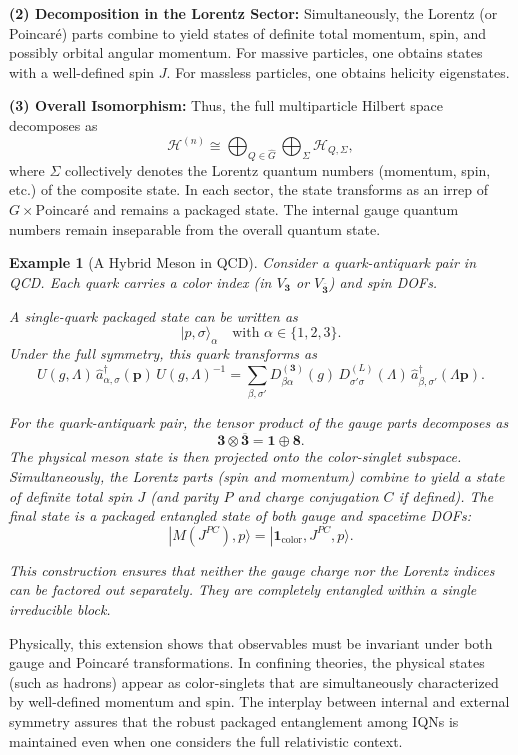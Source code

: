 \documentclass[12pt,a4paper]{article}
\newtheorem{example}{Example}
\begin{document}
\textbf{(2) Decomposition in the Lorentz Sector:}  
Simultaneously, the Lorentz (or Poincaré) parts combine to yield states of definite total momentum, spin, and possibly orbital angular momentum.
For massive particles, one obtains states with a well-defined spin $J$.
For massless particles, one obtains helicity eigenstates.

\textbf{(3) Overall Isomorphism:}  
Thus, the full multiparticle Hilbert space decomposes as
\[
\mathcal{H}^{(n)} \cong \bigoplus_{Q\in\hat{G}} \bigoplus_{\Sigma} \mathcal{H}_{Q,\Sigma},
\]
where $\Sigma$ collectively denotes the Lorentz quantum numbers (momentum, spin, etc.) of the composite state.
In each sector, the state transforms as an irrep of $G \times \mathrm{Poincaré}$ and remains a packaged state.
The internal gauge quantum numbers remain inseparable from the overall quantum state.


\begin{example}[A Hybrid Meson in QCD]
	Consider a quark-antiquark pair in QCD. Each quark carries a color index (in $V_{\mathbf{3}}$ or $V_{\overline{\mathbf{3}}}$) and spin DOFs.
	
	A single-quark packaged state can be written as
	\[
	|p,\sigma\rangle_{\alpha} \quad \text{with } \alpha\in\{1,2,3\}.
	\]
	Under the full symmetry, this quark transforms as
	\[
	U(g,\Lambda)\, \hat{a}^\dagger_{\alpha,\sigma}(\mathbf{p})\, U(g,\Lambda)^{-1} 
	= \sum_{\beta,\sigma'} D^{(\mathbf{3})}_{\beta\alpha}(g) \, D^{(L)}_{\sigma'\sigma}(\Lambda)\, \hat{a}^\dagger_{\beta,\sigma'}(\Lambda\mathbf{p}).
	\]
	
	For the quark-antiquark pair, the tensor product of the gauge parts decomposes as
	\[
	\mathbf{3} \otimes \overline{\mathbf{3}} = \mathbf{1} \oplus \mathbf{8}.
	\]
	The physical meson state is then projected onto the color-singlet subspace. Simultaneously, the Lorentz parts (spin and momentum) combine to yield a state of definite total spin $J$ (and parity $P$ and charge conjugation $C$ if defined).
	The final state is a packaged entangled state of both gauge and spacetime DOFs:
	\[
	|M(J^{PC}), p\rangle = |\mathbf{1}_{\text{color}}, J^{PC}, p\rangle.
	\]
	
	This construction ensures that neither the gauge charge nor the Lorentz indices can be factored out separately.
	They are completely entangled within a single irreducible block.
\end{example}


Physically, this extension shows that observables must be invariant under both gauge and Poincaré transformations.
In confining theories, the physical states (such as hadrons) appear as color-singlets that are simultaneously characterized by well-defined momentum and spin.
The interplay between internal and external symmetry assures that the robust packaged entanglement among IQNs is maintained even when one considers the full relativistic context.
\end{document}
